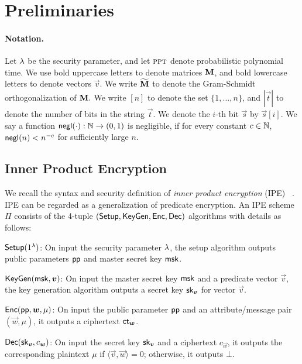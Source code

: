 \section{Preliminaries}
\paragraph{Notation.} Let $\lambda$ be the security parameter, and let $\textsc{ppt}$ denote probabilistic polynomial time. We use bold uppercase letters to denote matrices ${\bf M}$, and bold lowercase letters to denote vectors $\vec{v}$. We write $\widetilde{\mathbf{M}}$ to denote the Gram-Schmidt orthogonalization of $\mathbf{M}.$ We write $[n]$ to denote the set $\{1,...,n\}$, and $|\vec{t}|$ to denote the number of bits in the string $\vec{t}$. We denote the $i$-th bit $\vec{s}$ by $\vec{s}[i]$. We say a function $\mathsf{negl}(\cdot): \mathbb{N} \rightarrow (0,1)$ is negligible, if for every constant $c \in \mathbb{N}$, $\mathsf{negl}(n) < n^{-c}$ for sufficiently large $n$.

\subsection{Inner Product Encryption}
We recall the syntax and security definition of \emph{inner product encryption} (IPE) ~\cite{EC:KatSahWat08}. IPE can be regarded as a generalization of predicate encryption. An IPE scheme $\Pi$ consists of the 4-tuple $(\mathsf{Setup}, \mathsf{KeyGen}, \mathsf{Enc},
\\
\mathsf{Dec})$ algorithms with details as follows:
\begin{description}
 \item $\mathsf{Setup}(1^\lambda)$: On input the security parameter $\lambda$, the setup algorithm outputs public parameters $\mathsf{pp}$ and master secret key $\mathsf{msk}$.
 \item $\mathsf{KeyGen}(\mathsf{msk}, \boldsymbol{v})$: On input the master secret key $\mathsf{msk}$ and a predicate vector $\vec{v}$, the key generation algorithm outputs a secret key $\mathsf{sk}_{\boldsymbol{v}}$ for vector $\vec{v}$.
 \item $\mathsf{Enc}(\mathsf{pp}, \boldsymbol{w}, \mu)$: On input the public parameter $\mathsf{pp}$ and an attribute/message pair $(\vec{w}, \mu)$, it outputs a ciphertext $\mathsf{ct}_{\boldsymbol{w}}$.
 \item $\mathsf{Dec}(\mathsf{sk}_{\boldsymbol{v}}, c_{\boldsymbol{w}})$: On input the secret key $\mathsf{sk}_{\boldsymbol{v}}$ and a ciphertext $c_{\vec{w}}$, it outputs the corresponding plaintext $\mu$ if $\langle \vec{v}, \vec{w} \rangle = 0$; otherwise, it outputs $\bot$.
\end{description}

